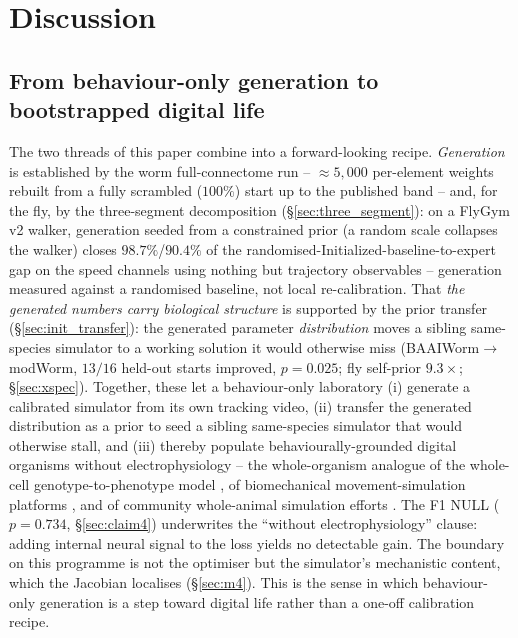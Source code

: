 \documentclass[11pt]{article}
\begin{document}
\section{Discussion}
\label{sec:disc}

\subsection{From behaviour-only generation to bootstrapped digital life}
\label{sec:digital_life}

The two threads of this paper combine into a forward-looking recipe. \emph{Generation} is established by the worm full-connectome run -- $\approx5{,}000$ per-element weights rebuilt from a fully scrambled ($100\%$) start up to the published band -- and, for the fly, by the three-segment decomposition (\S\ref{sec:three_segment}): on a FlyGym v2 walker, generation seeded from a constrained prior (a random scale collapses the walker) closes $98.7\%$/$90.4\%$ of the randomised-Initialized-baseline-to-expert gap on the speed channels using nothing but trajectory observables -- generation measured against a randomised baseline, not local re-calibration. That \emph{the generated numbers carry biological structure} is supported by the prior transfer (\S\ref{sec:init_transfer}): the generated parameter \emph{distribution} moves a sibling same-species simulator to a working solution it would otherwise miss (BAAIWorm$\to$modWorm, $13/16$ held-out starts improved, $p{=}0.025$; fly self-prior $9.3\times$; \S\ref{sec:xspec}). Together, these let a behaviour-only laboratory (i) generate a calibrated simulator from its own tracking video, (ii) transfer the generated distribution as a prior to seed a sibling same-species simulator that would otherwise stall, and (iii) thereby populate behaviourally-grounded digital organisms without electrophysiology -- the whole-organism analogue of the whole-cell genotype-to-phenotype model \citep{karr2012whole}, of biomechanical movement-simulation platforms \citep{delp2007opensim}, and of community whole-animal simulation efforts \citep{szigeti2014openworm}. The F1 NULL ($p{=}0.734$, \S\ref{sec:claim4}) underwrites the ``without electrophysiology'' clause: adding internal neural signal to the loss yields no detectable gain. The boundary on this programme is not the optimiser but the simulator's mechanistic content, which the Jacobian localises (\S\ref{sec:m4}). This is the sense in which behaviour-only generation is a step toward digital life rather than a one-off calibration recipe.
\end{document}
